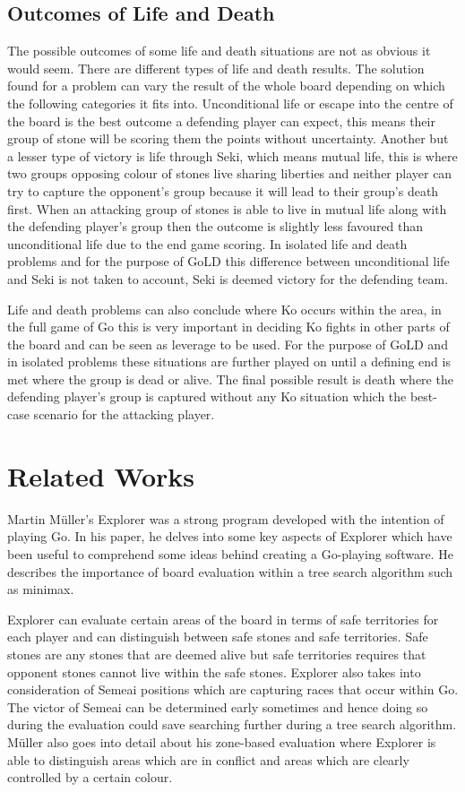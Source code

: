 \documentclass{l4proj}
\begin{document}
\subsection{Outcomes of Life and Death}
The possible outcomes of some life and death situations are not as obvious it would seem. There are different types of life and death results. The solution found for a problem can vary the result of the whole board depending on which the following categories it fits into.
Unconditional life or escape into the centre of the board is the best outcome a defending player can expect, this means their group of stone will be scoring them the points without uncertainty. Another but a lesser type of victory is life through Seki, which means mutual life, this is where two groups opposing colour of stones live sharing liberties and neither player can try to capture the opponent’s group because it will lead to their group’s death first. When an attacking group of stones is able to live in mutual life along with the defending player’s group then the outcome is slightly less favoured than unconditional life due to the end game scoring. In isolated life and death problems and for the purpose of GoLD this difference between unconditional life and Seki is not taken to account, Seki is deemed victory for the defending team.

Life and death problems can also conclude where Ko occurs within the area, in the full game of Go this is very important in deciding Ko fights in other parts of the board and can be seen as leverage to be used.  For the purpose of GoLD and in isolated problems these situations are further played on until a defining end is met where the group is dead or alive. The final possible result is death where the defending player’s group is captured without any Ko situation which the best-case scenario for the attacking player.


\section{Related Works}

Martin Müller's Explorer \cite{Muller2002} was a strong program developed with the intention of playing Go. In his paper, he delves into some key aspects of Explorer which have been useful to comprehend some ideas behind creating a Go-playing software. He describes the importance of board evaluation within a tree search algorithm such as minimax.

Explorer can evaluate certain areas of the board in terms of safe territories for each player and can distinguish between safe stones and safe territories. Safe stones are any stones that are deemed alive but safe territories requires that opponent stones cannot live within the safe stones. Explorer also takes into consideration of Semeai positions which are capturing races that occur within Go. The victor of Semeai can be determined early sometimes and hence doing so during the evaluation could save searching further during a tree search algorithm. Müller also goes into detail about his zone-based evaluation where Explorer is able to distinguish areas which are in conflict and areas which are clearly controlled by a certain colour.
\end{document}
